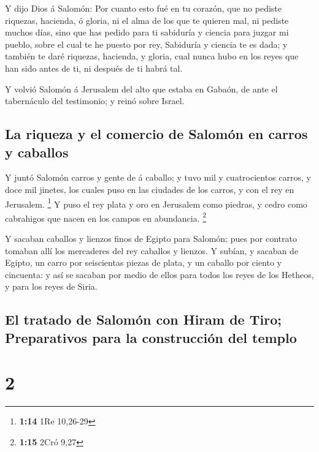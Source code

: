  Y dijo Dios á Salomón: Por cuanto esto fué en tu corazón,
que no pediste riquezas, hacienda, ó gloria, ni el alma de los que te
quieren mal, ni pediste muchos días, sino que has pedido para ti
sabiduría y ciencia para juzgar mi pueblo, sobre el cual te he puesto
por rey,  Sabiduría y ciencia te es dada; y también te daré
riquezas, hacienda, y gloria, cual nunca hubo en los reyes que han sido
antes de ti, ni después de ti habrá tal.

 Y volvió Salomón á Jerusalem del alto que estaba en
Gabaón, de ante el tabernáculo del testimonio; y reinó sobre Israel.

\hypertarget{la-riqueza-y-el-comercio-de-salomuxf3n-en-carros-y-caballos}{%
\subsection{La riqueza y el comercio de Salomón en carros y
caballos}\label{la-riqueza-y-el-comercio-de-salomuxf3n-en-carros-y-caballos}}

 Y juntó Salomón carros y gente de á caballo; y tuvo mil y
cuatrocientos carros, y doce mil jinetes, los cuales puso en las
ciudades de los carros, y con el rey en Jerusalem. \footnote{\textbf{1:14}
  1Re 10,26-29}  Y puso el rey plata y oro en Jerusalem
como piedras, y cedro como cabrahigos que nacen en los campos en
abundancia. \footnote{\textbf{1:15} 2Cró 9,27}

 Y sacaban caballos y lienzos finos de Egipto para Salomón;
pues por contrato tomaban allí los mercaderes del rey caballos y
lienzos.  Y subían, y sacaban de Egipto, un carro por
seiscientas piezas de plata, y un caballo por ciento y cincuenta: y así
se sacaban por medio de ellos para todos los reyes de los Hetheos, y
para los reyes de Siria.

\hypertarget{el-tratado-de-salomuxf3n-con-hiram-de-tiro-preparativos-para-la-construcciuxf3n-del-templo}{%
\subsection{El tratado de Salomón con Hiram de Tiro; Preparativos para
la construcción del
templo}\label{el-tratado-de-salomuxf3n-con-hiram-de-tiro-preparativos-para-la-construcciuxf3n-del-templo}}

\hypertarget{section-1}{%
\section{2}\label{section-1}}

